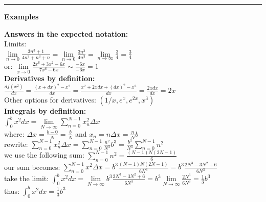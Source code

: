 \documentclass[12pt,a4paper]{report}
\begin{document}
	\rule{17cm}{1pt}
	
	\begin{center}\textbf{Examples}\end{center}
	
	\textbf{Answers in the expected notation:}\\
	Limits:\\
	$\lim\limits_{n \to 0} \frac{3n^3 + 1}{4n^3+n^3+n} = \lim\limits_{n \to 0} \frac{3n^3}{4n^3} = \lim\limits_{n \to \infty} \frac{3}{4} = \frac{3}{4}$\\
	or: $\lim\limits_{x \to 0} \frac{2x^6 + 3x^2 - 6x}{7x^6 - 6x} \sim \frac{-6x}{-6x} = 1$\\
	
	\textbf{Derivatives by definition:}\\
	$\frac{df(x^2)}{dx} = \frac{(x+dx)^2 - x^2}{dx} = \frac{x^2 + 2xdx+ (dx)^2-x^2}{dx} = \frac{2xdx}{dx} = 2x$\\
	
	Other options for derivatives: $(1/x, e^x, e^{2x}, x^3)$\\
	
	\textbf{Integrals by definition:}\\
	$\int_{0}^{b} x^2dx = \lim\limits_{N \to \infty} \sum_{n = 0}^{N - 1} x^2_n \Delta x$\\
	where:
	$\Delta x = \frac{b - 0}{N} = \frac{b}{N}$ and $x_n = n \Delta x = \frac{n}{N} b$\\
	rewrite:
	$\sum_{n = 0}^{N - 1} x^2_n \Delta x = \sum_{n = 0}^{N - 1} \frac{n^2}{N^3} b^3 = \frac{b^3}{N^3} \sum_{n = 0}^{N - 1} n^2$\\
	we use the following sum:
	$\sum_{n = 0}^{N - 1} n^2 = \frac{(N-1)N(2N-1)}{6}$\\
	our sum becomes:
	$\sum_{n = 0}^{N - 1} x^2 \Delta x = b^3 \frac{(N-1)N(2N-1)}{6N^3} = b^3 \frac{2N^3 - 3N^2 + 6}{6N^3}$\\
	take the limit:
	$\int_{0}^{b} x^2 dx = \lim\limits_{N \to \infty} b^3 \frac{2N^3 - 3N^2 + 6}{6N^3} = b^3 \lim\limits_{N \to \infty} \frac{2N^3}{6N^3} = \frac{1}{3}b^3$\\
	thus: $\int_{0}^{b} x^2 dx = \frac{1}{3} b^3$\\
	
\end{document}
